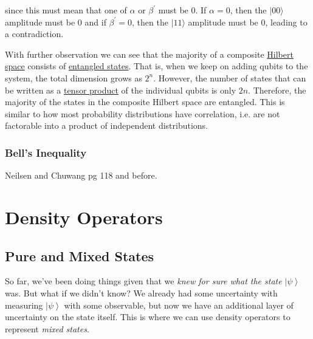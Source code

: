 \documentclass{article}
\newcommand{\ket}[1]{\ensuremath{\left|#1\right\rangle}}
\begin{document}
      since this must mean that one of $\alpha$ or $\beta^\prime$ must be $0$. If $\alpha = 0$, then the $|00\rangle$ amplitude must be $0$ and if $\beta^\prime = 0$, then the $|11\rangle$ amplitude must be $0$, leading to a contradiction. 

      With further observation we can see that the majority of a composite \hyperref[fa-def:hilbert-space]{Hilbert space} consists of \hyperref[def:entangled-state]{entangled states}. That is, when we keep on adding qubits to the system, the total dimension grows as $2^n$. However, the number of states that can be written as a \hyperref[sm-def:tensor-product]{tensor product} of the individual qubits is only $2n$. Therefore, the majority of the states in the composite Hilbert space are entangled. This is similar to how most probability distributions have correlation, i.e. are not factorable into a product of independent distributions. 

    \subsubsection{Bell's Inequality} 

      Neilsen and Chuwang pg 118 and before. 

\section{Density Operators} 

  \subsection{Pure and Mixed States}

    So far, we've been doing things given that we \textit{knew for sure what the state } $\ket{\psi}$ was. But what if we didn't know? We already had some uncertainty with measuring $\ket{\psi}$ with some observable, but now we have an additional layer of uncertainty on the state itself. This is where we can use density operators to represent \textit{mixed states}. 
\end{document}
